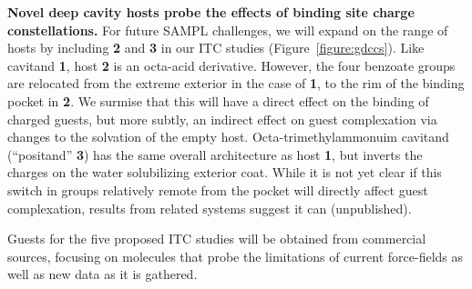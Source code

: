 \documentclass[11pt]{article}
\begin{document}
{\bf Novel deep cavity hosts probe the effects of binding site charge constellations.} 
For future SAMPL challenges, we will expand on the range of hosts by including {\bf 2} and {\bf 3} in our ITC studies (Figure~\ref{figure:gdccs}).  
Like cavitand {\bf 1}, host {\bf 2} is an octa-acid derivative.  However, the four benzoate groups are relocated from the extreme exterior in the case of {\bf 1}, to the rim of the binding pocket in {\bf 2}.  
We surmise that this will have a direct effect on the binding of charged guests, but more subtly, an indirect effect on guest complexation via changes to the solvation of the empty host.  
Octa-trimethylammonuim cavitand (``positand'' {\bf 3}) has the same overall architecture as host {\bf 1}, but inverts the charges on the water solubilizing exterior coat.  
While it is not yet clear if this switch in groups relatively remote from the pocket will directly affect guest complexation, results from related systems suggest it can (unpublished).

Guests for the five proposed ITC studies will be obtained from commercial sources, focusing on molecules that probe the limitations of current force-fields as well as new data as it is gathered.   
\end{document}

